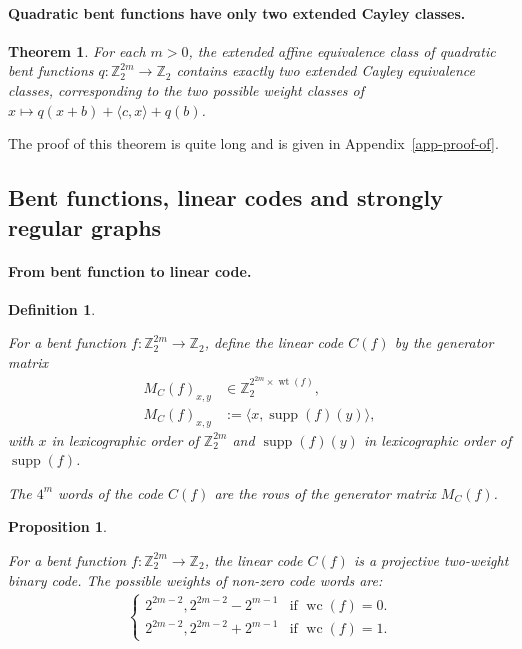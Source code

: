 \documentclass[12pt,a4paper]{article}
\newcommand{\mb}[1]{\mathbb{#1}}
\newcommand{\Z}{\mb{Z}}
\newcommand{\To}{\rightarrow}
\newcommand{\support}[1]{\operatorname{supp}\left(#1\right)}
\newcommand{\weight}[1]{\operatorname{wt}\left(#1\right)}
\newcommand{\weightclass}[1]{\operatorname{wc}\left(#1\right)}
\newtheorem{Proposition}{Proposition}
\newtheorem{Theorem}{Theorem}
\newtheorem{Definition}{Definition}
\begin{document}
\paragraph*{Quadratic bent functions have only two extended Cayley classes.}
\begin{Theorem}
\label{th-Quadratic-Classes}
For each $m>0$, the extended affine equivalence class of quadratic bent functions
$q : \Z_2^{2m} \To \Z_2$ contains exactly two extended Cayley equivalence classes,
corresponding to the two possible weight classes of
$x \mapsto q(x+b) + \langle c, x \rangle + q(b)$.
\end{Theorem}

The proof of this theorem is quite long and is given in Appendix~\ref{app-proof-of}.

\subsection{Bent functions, linear codes and strongly regular graphs}
\paragraph*{From bent function to linear code.}
\begin{Definition}
\cite[Corollary 10]{DinD15class}

For a bent function $f : \Z_2^{2m} \To \Z_2$,
define the linear code $C(f)$ by the generator matrix
\begin{align*}
M_C(f)_{x,y} &\in \Z_2^{2^{2m} \times \weight{f}},
\\
M_C(f)_{x,y} &:= \langle x, \support{f}(y) \rangle,
\end{align*}
with $x$ in lexicographic order of $\Z_2^{2m}$
and $\support{f}(y)$ in lexicographic order of $\support{f}$.

The $4^m$ words of the code $C(f)$ are the rows of the generator matrix $M_C(f)$.
\end{Definition}

%
\begin{Proposition}
\cite[Corollary 10]{DinD15class}

For a bent function $f : \Z_2^{2m} \To \Z_2$, the linear code $C(f)$
is a projective two-weight binary code.
%
%
The possible weights of non-zero code words are:
\begin{align*}
\begin{cases}
2^{2m-2}, 2^{2m-2} - 2^{m-1} & \text{if~} \weightclass{f}=0.
\\
2^{2m-2}, 2^{2m-2} + 2^{m-1} & \text{if~} \weightclass{f}=1.
\end{cases}
\end{align*}
%
\end{Proposition}
%
%
\end{document}
